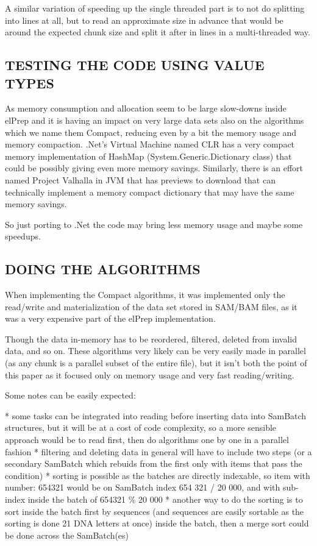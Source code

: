 \documentclass[a4paper,twoside]{article}
\begin{document}
A similar variation of speeding up the single threaded part is to not do splitting into lines at all, but to read an approximate size in advance that would be around the expected chunk size
and split it after in lines in a multi-threaded way.

\subsection{\uppercase{Testing the code using Value Types}}\label{subsec:uppercase4}

As memory consumption and allocation seem to be large slow-downs inside elPrep and it is having an impact on very large data sets also on the algorithms which we name them Compact,
reducing even by a bit the memory usage and memory compaction.
.Net's Virtual Machine named CLR has a very compact memory implementation of HashMap (System.Generic.Dictionary class) that could be possibly giving even more memory savings.
Similarly, there is an effort named Project Valhalla in JVM that has previews to download that can technically implement a memory compact dictionary that may have the same memory savings.

So just porting to .Net the code may bring less memory usage and maybe some speedups.

\subsection{\uppercase{Doing the algorithms}}\label{subsec:uppercase3}

When implementing the Compact algorithms, it was implemented only the read/write and materialization of the data set stored in SAM/BAM files, as it was a very expensive part of the
elPrep implementation.

Though the data in-memory has to be reordered, filtered, deleted from invalid data, and so on.
These algorithms very likely can be very easily made in parallel (as any chunk is a parallel subset of the entire file), but it isn't both the point of this paper as it focused
only on memory usage and very fast reading/writing.

Some notes can be easily expected:

* some tasks can be integrated into reading before inserting data into SamBatch structures, but it will be at a cost of code complexity,
so a more sensible approach would be to read first, then do algorithms one by one in a parallel fashion
* filtering and deleting data in general will have to include two steps (or a secondary SamBatch which rebuids from the first only with items that pass the condition)
* sorting is possible as the batches are directly indexable, so item with number: 654321 would be on SamBatch index 654 321 / 20 000, and with sub-index inside the batch of 654321 \% 20 000
* another way to do the sorting is to sort inside the batch first by sequences (and sequences are easily sortable as the sorting is done 21 DNA letters at once) inside the batch,
then a merge sort could be done across the SamBatch(es)
\end{document}
